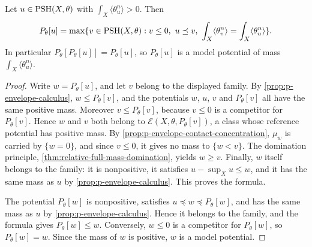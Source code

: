 \begin{theorem}\label{thm:positive-mass-model-characterization}
Let $u\in\mathrm{PSH}(X,\theta)$ with $\int_X\langle\theta_u^n\rangle>0$. Then
\[
 P_\theta[u]=\max\{v\in\PSH(X,\theta):v\leq0,
                         \ u\preceq v,\ \int_X\langle\theta_v^n\rangle=\int_X\langle\theta_u^n\rangle\}.
\]
In particular $P_\theta[P_\theta[u]]=P_\theta[u]$, so $P_\theta[u]$ is a model potential of mass $\int_X\langle\theta_u^n\rangle$.
\end{theorem}
\begin{proof}
Write $w=P_\theta[u]$, and let $v$ belong to the displayed family. By \cref{prop:p-envelope-calculus}, $w\leq P_\theta[v]$, and the potentials $w$, $u$, $v$ and $P_\theta[v]$ all have the same positive mass. Moreover $v\leq P_\theta[v]$, because $v\leq0$ is a competitor for $P_\theta[v]$. Hence $w$ and $v$ both belong to $\mathcal E(X,\theta,P_\theta[v])$, a class whose reference potential has positive mass. By \cref{prop:p-envelope-contact-concentration}, $\mu_w$ is carried by $\{w=0\}$, and since $v\leq0$, it gives no mass to $\{w<v\}$. The domination principle, \cref{thm:relative-full-mass-domination}, yields $w\geq v$. Finally, $w$ itself belongs to the family: it is nonpositive, it satisfies $u-\sup_Xu\leq w$, and it has the same mass as $u$ by \cref{prop:p-envelope-calculus}. This proves the formula.

The potential $P_\theta[w]$ is nonpositive, satisfies $u\preceq w\preceq P_\theta[w]$, and has the same mass as $u$ by \cref{prop:p-envelope-calculus}. Hence it belongs to the family, and the formula gives $P_\theta[w]\leq w$. Conversely, $w\leq0$ is a competitor for $P_\theta[w]$, so $P_\theta[w]=w$. Since the mass of $w$ is positive, $w$ is a model potential.
\end{proof}

